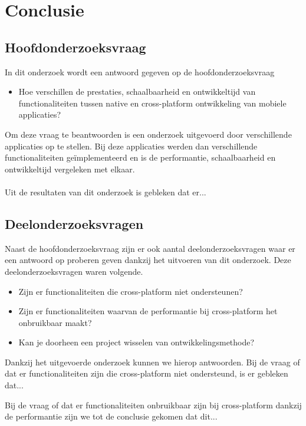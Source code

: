 
\chapter{Conclusie}%
\label{ch:conclusie}


\section{Hoofdonderzoeksvraag}
In dit onderzoek wordt een antwoord gegeven op de hoofdonderzoeksvraag 
\begin{itemize}
    \item Hoe verschillen de prestaties, schaalbaarheid en ontwikkeltijd van functionaliteiten tussen native en cross-platform ontwikkeling van mobiele applicaties?
\end{itemize}
Om deze vraag te beantwoorden is een onderzoek uitgevoerd door verschillende applicaties op te stellen. 
Bij deze applicaties werden dan verschillende functionaliteiten geïmplementeerd en is de performantie, 
schaalbaarheid en ontwikkeltijd vergeleken met elkaar. 
\\\\
Uit de resultaten van dit onderzoek is gebleken dat er...


\section{Deelonderzoeksvragen}
Naast de hoofdonderzoeksvraag zijn er ook aantal deelonderzoeksvragen waar er een antwoord op proberen 
geven dankzij het uitvoeren van dit onderzoek. 
Deze deelonderzoeksvragen waren volgende.
\begin{itemize}
    \item Zijn er functionaliteiten die cross-platform niet ondersteunen?
    \item Zijn er functionaliteiten waarvan de performantie bij cross-platform het onbruikbaar maakt?
    \item Kan je doorheen een project wisselen van ontwikkelingsmethode?
\end{itemize}
Dankzij het uitgevoerde onderzoek kunnen we hierop antwoorden. Bij de vraag of dat er 
functionaliteiten zijn die cross-platform niet ondersteund, 
is er gebleken dat...

Bij de vraag of dat er functionaliteiten onbruikbaar zijn bij cross-platform dankzij de performantie 
zijn we tot de conclusie gekomen dat dit...
